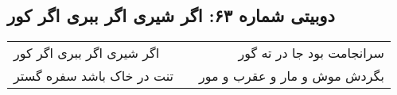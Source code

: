 \begin{center}
\section*{دوبیتی شماره ۶۳: اگر شیری اگر ببری اگر کور}
\label{sec:063}
\begin{longtable}{l p{0.5cm} r}
اگر شیری اگر ببری اگر کور
&&
سرانجامت بود جا در ته گور
\\
تنت در خاک باشد سفره گستر
&&
بگردش موش و مار و عقرب و مور
\\
\end{longtable}
\end{center}

